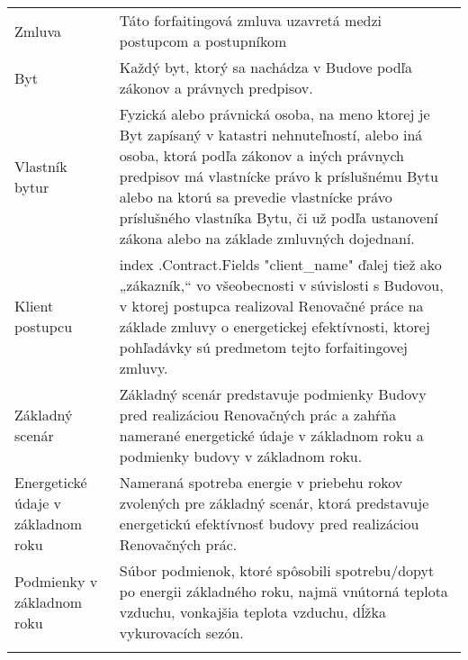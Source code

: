 \documentclass[a4paper]{article}
\begin{document}
\begin{longtabu}{|X|X[2]|} \tabucline{}


  Zmluva & Táto forfaitingová zmluva uzavretá medzi postupcom a postupníkom \\\tabucline{}
   \hline

   Byt & Každý byt, ktorý sa nachádza v Budove podľa zákonov a právnych predpisov. \\\tabucline{}

   \hline

   Vlastník bytur & Fyzická alebo právnická osoba, na meno ktorej je Byt zapísaný v katastri nehnuteľností, alebo iná osoba, ktorá podľa zákonov a iných právnych predpisov má vlastnícke právo k príslušnému Bytu alebo na ktorú sa prevedie vlastnícke právo príslušného vlastníka Bytu, či už podľa ustanovení zákona alebo na základe zmluvných dojednaní. \\\tabucline{}

   \hline

   Klient postupcu &  {{index .Contract.Fields "client_name"}} ďalej tiež ako „zákazník,“ vo všeobecnosti v súvislosti s Budovou, v ktorej postupca realizoval Renovačné práce na základe zmluvy o energetickej efektívnosti, ktorej pohľadávky sú predmetom tejto forfaitingovej zmluvy.\\\tabucline{}

   \hline

   Základný scenár & Základný scenár predstavuje podmienky Budovy pred realizáciou Renovačných prác a zahŕňa namerané energetické údaje v základnom roku a podmienky budovy v základnom roku.  \\\tabucline{}

   \hline

   Energetické údaje v základnom roku & Nameraná spotreba energie v priebehu rokov zvolených pre základný scenár, ktorá predstavuje energetickú efektívnosť budovy pred realizáciou Renovačných prác. \\\tabucline{}

   \hline

   Podmienky v základnom roku & Súbor podmienok, ktoré spôsobili spotrebu/dopyt po energii základného roku, najmä vnútorná teplota vzduchu, vonkajšia teplota vzduchu, dĺžka vykurovacích sezón. \\\tabucline{}


\end{longtabu}
\end{document}
